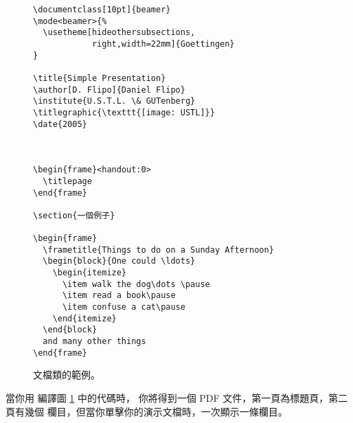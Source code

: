 \begin{figure}[htbp]
\begin{verbatim}
\documentclass[10pt]{beamer}
\mode<beamer>{%
  \usetheme[hideothersubsections,
            right,width=22mm]{Goettingen}
}

\title{Simple Presentation}
\author[D. Flipo]{Daniel Flipo}
\institute{U.S.T.L. \& GUTenberg}
\titlegraphic{\texttt{[image: USTL]}}
\date{2005}



\begin{frame}<handout:0>
  \titlepage
\end{frame}

\section{一個例子}

\begin{frame}
  \frametitle{Things to do on a Sunday Afternoon}
  \begin{block}{One could \ldots}
    \begin{itemize}
      \item walk the dog\dots \pause
      \item read a book\pause
      \item confuse a cat\pause
    \end{itemize}
  \end{block}
  and many other things
\end{frame}

\end{verbatim}
\caption{  文檔類的範例。}
  \label{fig:code-beamer}
\end{figure}


當你用  編譯圖 \ref{fig:code-beamer} 中的代碼時，
你將得到一個 PDF 文件，第一頁為標題頁，第二頁有幾個
欄目，但當你單擊你的演示文檔時，一次顯示一條欄目。


